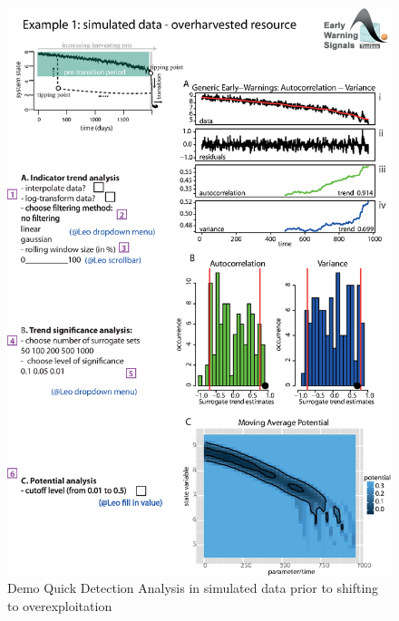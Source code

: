\documentclass[12pt,a4paper,final]{article}
\begin{document}

\begin{figure}[ht]
\begin{center}
\includegraphics[scale=0.8]{fig_2_simulated_970pts.eps}
\caption{Demo Quick Detection Analysis in simulated data prior to shifting to overexploitation}
\end{center}
\label{fig:simulatedQDA}
\end{figure}
\end{document}
